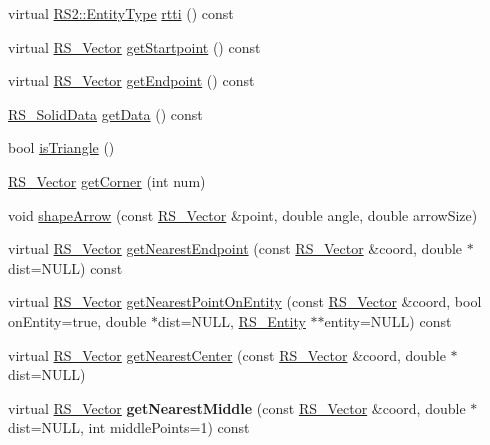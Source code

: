 \begin{DoxyCompactItemize}
\item 
virtual \hyperlink{classRS2_a8f26d1b981e1e85cff16738b43337e6a}{R\-S2\-::\-Entity\-Type} \hyperlink{classRS__Solid_a9435b8fccae8eaa511bcb534de2355de}{rtti} () const 
\item 
virtual \hyperlink{classRS__Vector}{R\-S\-\_\-\-Vector} \hyperlink{classRS__Solid_ab27cc65d8510d9a100ebc48d39908aa5}{get\-Startpoint} () const 
\item 
virtual \hyperlink{classRS__Vector}{R\-S\-\_\-\-Vector} \hyperlink{classRS__Solid_a45c5a57ce9579707a12378862dd2ce00}{get\-Endpoint} () const 
\item 
\hyperlink{classRS__SolidData}{R\-S\-\_\-\-Solid\-Data} \hyperlink{classRS__Solid_a1575213c452f4024b272517d207f6e44}{get\-Data} () const 
\item 
bool \hyperlink{classRS__Solid_a5aab4d9bcfed9680eb65b6147aec404e}{is\-Triangle} ()
\item 
\hyperlink{classRS__Vector}{R\-S\-\_\-\-Vector} \hyperlink{classRS__Solid_aa4e38ae4961af1e48d323daf20bbeac9}{get\-Corner} (int num)
\item 
void \hyperlink{classRS__Solid_aa858b684fa7af9ca0a66949e55852e44}{shape\-Arrow} (const \hyperlink{classRS__Vector}{R\-S\-\_\-\-Vector} \&point, double angle, double arrow\-Size)
\item 
virtual \hyperlink{classRS__Vector}{R\-S\-\_\-\-Vector} \hyperlink{classRS__Solid_a3a8dcdc9cc6c65ddcfaee88a3aa6537b}{get\-Nearest\-Endpoint} (const \hyperlink{classRS__Vector}{R\-S\-\_\-\-Vector} \&coord, double $\ast$dist=N\-U\-L\-L) const 
\item 
virtual \hyperlink{classRS__Vector}{R\-S\-\_\-\-Vector} \hyperlink{classRS__Solid_a78c72a3188ed7b329c54d73cabca96a1}{get\-Nearest\-Point\-On\-Entity} (const \hyperlink{classRS__Vector}{R\-S\-\_\-\-Vector} \&coord, bool on\-Entity=true, double $\ast$dist=N\-U\-L\-L, \hyperlink{classRS__Entity}{R\-S\-\_\-\-Entity} $\ast$$\ast$entity=N\-U\-L\-L) const 
\item 
virtual \hyperlink{classRS__Vector}{R\-S\-\_\-\-Vector} \hyperlink{classRS__Solid_a18a276c399290fd60ae8c5c732496f7d}{get\-Nearest\-Center} (const \hyperlink{classRS__Vector}{R\-S\-\_\-\-Vector} \&coord, double $\ast$dist=N\-U\-L\-L)
\item 
\hypertarget{classRS__Solid_a9b16db7f1043c88dc2917315c44dea2e}{virtual \hyperlink{classRS__Vector}{R\-S\-\_\-\-Vector} {\bfseries get\-Nearest\-Middle} (const \hyperlink{classRS__Vector}{R\-S\-\_\-\-Vector} \&coord, double $\ast$dist=N\-U\-L\-L, int middle\-Points=1) const }\label{classRS__Solid_a9b16db7f1043c88dc2917315c44dea2e}


\end{DoxyCompactItemize}
